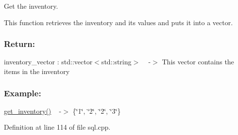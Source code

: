Get the inventory. 

This function retrieves the inventory and its values and puts it into a vector. ~\newline


\subsubsection*{Return\+: }

inventory\+\_\+vector \+: std\+::vector$<$std\+::string$>$ ~\newline
-\/$>$ This vector contains the items in the inventory

\subsubsection*{Example\+: }

\hyperlink{classsql_a7f818b967453b1ae15ce4c5b28cf4765}{get\+\_\+inventory()} ~\newline
-\/$>$ \{\char`\"{}1\char`\"{}, \char`\"{}2\char`\"{}, \char`\"{}2\char`\"{}, \char`\"{}3\char`\"{}\} 

Definition at line 114 of file sql.\+cpp.

